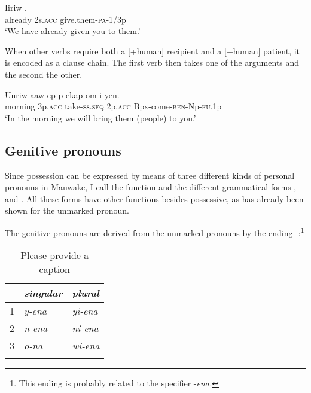 \ea%
\label{ex:3:x565}
\gll Iiriw  . \\
already 2s.\textsc{acc} give.them-\textsc{pa}-1/3p\\
\glt`We have already given you to them.'
\z

When other verbs require both a [+human] recipient and a [+human] patient, it is encoded as a clause chain. The first verb then takes one of the arguments and the second the other.

\ea%
\label{ex:3:x566}
\gll Uuriw  aaw-ep  p-ekap-om-i-yen. \\
morning 3p.\textsc{acc} take-\textsc{ss}.\textsc{seq} 2p.\textsc{acc} Bpx-come-\textsc{ben}-Np-\textsc{fu}.1p\\
\glt`In the morning we will bring them (people) to you.'
\z

\subsection{Genitive pronouns}\label{sec:3.5.4}
{}
Since possession can be expressed by means of three different kinds of personal pronouns in Mauwake, I call the function  and the different grammatical forms , \textstyleDefinedWords{} and . All these forms have other functions besides possessive, as has already been shown for the unmarked pronoun. 

The genitive pronouns are derived from the unmarked pronouns by the ending \nobreakdash-:\footnote{This ending is probably related to the specifier -\textit{ena.}}

\begin{table}
\caption{Please provide a caption}
\label{} 
\begin{tabular}{l>{\itshape}l>{\itshape}l}
\mytoprule
 &\upshape singular &\upshape plural\\
\midrule
1 &y-ena &yi-ena\\
2 &n-ena &ni-ena\\
3 &o-na &wi-ena\\
\mybottomrule
\end{tabular}
\end{table}


